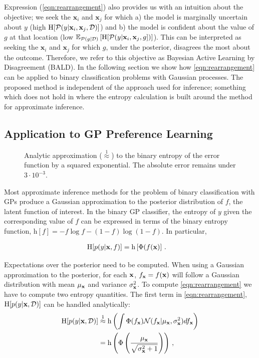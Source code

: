Expression (\ref{eqn:rearrangement}) also provides us with an intuition about the objective;
we seek the $\mathbf{x}_i$ and $\mathbf{x}_j$ for which a) the model is marginally
uncertain about $y$ (high $\mathrm{H}[\mathcal{P}(y | \mathbf{x}_i,\mathbf{x}_j, \mathcal{D})]$) and
b) the model is confident about the value of $g$ at that location
(low $\mathbb{E}_{\mathcal{P}(g|\mathcal{D})} \left[\mathrm{H} [ \mathcal{P}(y |\mathbf{x}_i,\mathbf{x}_j,g] \right)]$).
This can be interpreted as seeking the $\mathbf{x}_i$ and $\mathbf{x}_j$ for which
$g$, under the posterior, disagrees the most about the outcome.
Therefore, we refer to this objective as Bayesian Active Learning by Disagreement (BALD).
In the following section we show how \eqref{eqn:rearrangement} can be applied to binary classification problems with Gaussian processes. The proposed method is independent of the approach used for inference; something which does not hold in \citep{mackay1992, krishnapuram2004, lawrence2002} where the entropy calculation is built around the method for approximate inference.

\subsection{Application to GP Preference Learning}

\begin{figure}[t]\centering

\caption{Analytic approximation ({\scriptsize $\stackrel{1}{\approx}$}) to the binary entropy of the error function by a squared exponential. The absolute error remains under $3 \cdot 10^{-3}$. \label{fig:trick}}
\end{figure} 

Most approximate inference methods for the problem of binary classification with
GPs produce a Gaussian approximation to the posterior distribution of $f$, the
latent function of interest. In the binary GP classifier, the entropy of $y$ given the corresponding value of $f$ 
can be expressed in terms of the binary entropy function, $\mathrm{h}[f]=- f\log f - (1-f)\log(1-f)$.
In particular,

\begin{align}
\mathrm{H}[p(y\vert\mathbf{x},f)] &= \mathrm{h}\left[\Phi(f(\mathbf{x})\right]\,. \notag
\end{align}

Expectations over the posterior need to be computed. When using a Gaussian approximation to the posterior, for each $\mathbf{x}$, $f_{\mathbf{x}} = f(\mathbf{x})$ will follow a Gaussian distribution with mean $\mu_{\mathbf{x}}$ and variance $\sigma_{\mathbf{x}}^2$. To compute \eqref{eqn:rearrangement} we have to compute two entropy quantities. The first term in \eqref{eqn:rearrangement}, $\mathrm{H}[p(y\vert\mathbf{x},\mathcal{D})]$ can be handled analytically:
\begin{align}
        \mathrm{H}[p(y\vert\mathbf{x},\mathcal{D})] &\stackrel{1}{\approx} \mathrm{h}\left( \int \Phi( f_{\mathbf{x}} )  \mathcal{N}(f_{\mathbf{x}}| \mu_{\mathbf{x}},\sigma_{\mathbf{x}}^2) df_{\mathbf{x}} \right) \notag \\ 
        &= \mathrm{h} \left( \Phi\left( \frac{\mu_{\mathbf{x}}}{\sqrt{\sigma^2_{\mathbf{x}} + 1}} \right)\right)\,, \label{ent_mean}
\end{align}

